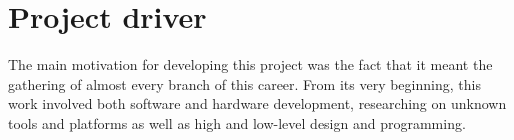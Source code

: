 \begin{comment}
				For this goal an USB-capable board equipped with an MSP430 microcontroller was chosen for acting
				as the receiver accessory. More specifically, this microcontroller would be running FreeRTOS
				(operating system oriented to tasks with real-time needs), which would be accordingly modified
				for dealing with the USB interface and 802.15.4 communication.\\
				It is also noteworthy that the usage of a prototyping board and a potential miniaturisation of
				the previously described board were included into the scope of this objective as well. Besides, 
				full description and more details about this development and 802.15.4 communication can be found 
				at \autoref{ch:hardware}, \nameref{ch:hardware}.\\
			\item \emph{Android ECG application}\\
				Finally, an Android application acts as the system's frontend. Its most relevant requirements were
				determined by the existing EPFL iOS application, with subtle modifications due to the different
				platform as well as the inclusion of an extra accessory.\\
				The data the application displays, in the shape of ECG waves, may be retrieved from a Bluetooth
				or 802.15.4 streaming node or a local log file. These logs are written by the application itself
				as it receives an incoming data transmission, so that it can replay them later --original
				iOS application lacked this feature--.\\
				Moreover, view controls shall also be offered for the user to modify display density, and move
				forwards and backwards if a log is being displayed.\\
				More information about the application, such as requirements and other details, can be found
				at \autoref{ch:swdev}, \nameref{ch:swdev}.\\
		\end{enumerate}
		\end{comment}
		
	\section{Project driver}
		The main motivation for developing this project was the fact that it meant
		the gathering of almost every branch of this career. From its very beginning, this
		work involved both software and hardware development, researching on unknown 
		tools and platforms as well as high and low-level design and programming.\\

